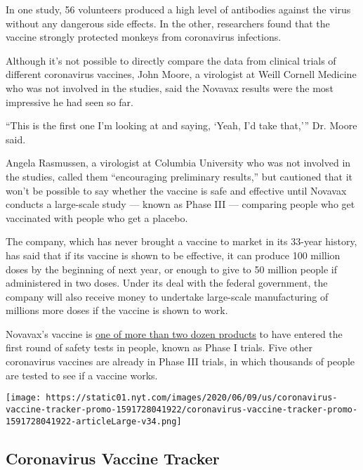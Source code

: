 In one study, 56 volunteers produced a high level of antibodies against
the virus without any dangerous side effects. In the other, researchers
found that the vaccine strongly protected monkeys from coronavirus
infections.

Although it's not possible to directly compare the data from clinical
trials of different coronavirus vaccines, John Moore, a virologist at
Weill Cornell Medicine who was not involved in the studies, said the
Novavax results were the most impressive he had seen so far.

``This is the first one I'm looking at and saying, `Yeah, I'd take
that,''' Dr. Moore said.

Angela Rasmussen, a virologist at Columbia University who was not
involved in the studies, called them ``encouraging preliminary
results,'' but cautioned that it won't be possible to say whether the
vaccine is safe and effective until Novavax conducts a large-scale study
--- known as Phase III --- comparing people who get vaccinated with
people who get a placebo.

The company, which has never brought a vaccine to market in its 33-year
history, has said that if its vaccine is shown to be effective, it can
produce 100 million doses by the beginning of next year, or enough to
give to 50 million people if administered in two doses. Under its deal
with the federal government, the company will also receive money to
undertake large-scale manufacturing of millions more doses if the
vaccine is shown to work.

Novavax's vaccine is
\href{https://www.nytimes.com/interactive/2020/science/coronavirus-vaccine-tracker.html}{one
of more than two dozen products} to have entered the first round of
safety tests in people, known as Phase I trials. Five other coronavirus
vaccines are already in Phase III trials, in which thousands of people
are tested to see if a vaccine works.

\href{https://www.nytimes.com/interactive/2020/science/coronavirus-vaccine-tracker.html}{}

\texttt{[image: https://static01.nyt.com/images/2020/06/09/us/coronavirus-vaccine-tracker-promo-1591728041922/coronavirus-vaccine-tracker-promo-1591728041922-articleLarge-v34.png]}

\hypertarget{coronavirus-vaccine-tracker}{%
\subsection{Coronavirus Vaccine
Tracker}\label{coronavirus-vaccine-tracker}}

